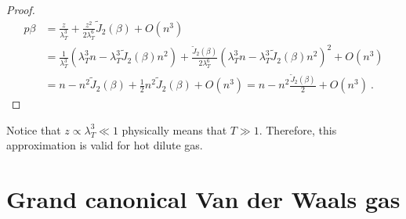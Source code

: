 \begin{proof}
        \begin{equation*}
        \begin{aligned}
            p \beta & = \frac{z}{\lambda_T^3} + \frac{z^2}{2 \lambda_T^6} \tilde J_2 (\beta) + O(n^3) \\ & = \frac{1}{\lambda_T^3} (\lambda_T^3 n - \lambda^3_T \tilde J_2(\beta) n^2) + \frac{\tilde J_2 (\beta)}{2 \lambda_T^6} ( \lambda_T^3 n - \lambda^3_T \tilde J_2(\beta) n^2)^2 + O(n^3) \\ & = n - n^2 \tilde J_2 (\beta) + \frac{1}{2} n^2 \tilde J_2 (\beta) + O(n^3) = n - n^2 \frac{\tilde J_2(\beta)}{2} + O(n^3) ~.
        \end{aligned}
        \end{equation*}
    \end{proof}
    Notice that $z \propto \lambda^3_T \ll 1$ physically means that $T \gg 1$. Therefore, this approximation is valid for hot dilute gas.

\section{Grand canonical Van der Waals gas}

